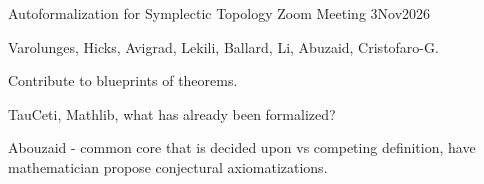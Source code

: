 
Autoformalization for Symplectic Topology Zoom Meeting 3Nov2026

Varolunges, Hicks, Avigrad, Lekili, Ballard, Li, Abuzaid, Cristofaro-G.

Contribute to blueprints of theorems.

TauCeti, Mathlib, what has already been formalized?

Abouzaid - common core that is decided upon vs competing definition, have mathematician propose conjectural axiomatizations.
